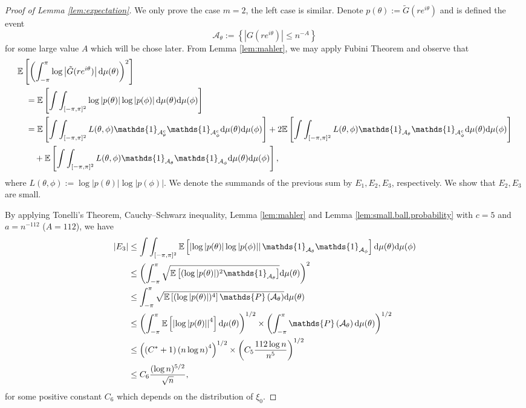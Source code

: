 \documentclass[12pt]{amsart}
\theoremstyle{plain}
\numberwithin{equation}{section}
\renewcommand{\Pr}{\mathbb{P}}
\newcommand{\<}{\langle}
\renewcommand{\>}{\rangle}
\newcommand{\PP}[1]{\left(#1\right)}
\newcommand{\LL}[1]{\left\{#1\right\}}
\newcommand{\dd}{\textnormal{d}}
\newcommand{\E}[2][ ]{\mathbb{E}{#1}\left[#2\right]}
\newcommand{\abs}[1]{\left|#1\right|}
\renewcommand{\Pr}[1]{\mathds{P}\left(#1\right)}
\begin{document}
\begin{proof}[Proof of Lemma \ref{lem:expectation}]
We only prove the case $m=2$, the left case is similar.  Denote $p(\theta) := \tilde{G}(re^{i\theta})$ and is defined the event \[ \mathcal{A}_\theta := \LL{ \abs{G(re^{i\theta})} \leq n^{-A} } \] for some large value $A$ which will be chose later. From Lemma \ref{lem:mahler}, we may apply Fubini Theorem and observe that
\begin{align*}
& \E{\PP{ \int_{-\pi}^{\pi} \log\abs{\tilde{G}(re^{i\theta})} \dd\mu(\theta) }^2} \\
& \quad = \E{\int\int_{[-\pi,\pi]^2} \log\abs{p(\theta)} \log\abs{p(\phi)} \dd\mu(\theta)\dd\mu(\phi) } \\
& \quad = \E{ \int\int_{[-\pi,\pi]^2}  L(\theta,\phi) \mathds{1}_{\mathcal{A}^c_\theta} \mathds{1}_{\mathcal{A}^c_{\phi}} \dd\mu(\theta) \dd\mu(\phi)} + 2\E{\int\int_{[-\pi,\pi]^2}  L(\theta,\phi) \mathds{1}_{\mathcal{A}_\theta} \mathds{1}_{\mathcal{A}^c_{\phi}} \dd\mu(\theta) \dd\mu(\phi)} \\
& \quad\quad + \E{\int\int_{[-\pi,\pi]^2}  L(\theta,\phi) \mathds{1}_{\mathcal{A}_\theta} \mathds{1}_{\mathcal{A}_{\phi}} \dd\mu(\theta)\dd\mu(\phi)},
\end{align*}
where $L(\theta,\phi):= \log\abs{p(\theta)} \log\abs{p(\phi)} $. We denote the summands of the previous sum by $E_1,E_2,E_3$, respectively. We show that $E_2, E_3$ are small.

By applying Tonelli's Theorem, Cauchy--Schwarz inequality, Lemma \ref{lem:mahler} and Lemma \ref{lem:small.ball.probability} with $c=5$ and $a=n^{-112}$ ($A=112$), we have 
\begin{align*}
\abs{E_3} & \leq \int\int_{[-\pi,\pi]^2}\E{ \abs{\log\abs{p(\theta)} \log\abs{p(\phi)}} \mathds{1}_{\mathcal{A}_\theta} \mathds{1}_{\mathcal{A}_{\phi}} } \dd\mu(\theta) \dd\mu(\phi) \\
& \leq \PP{\int_{-\pi}^{\pi} \sqrt{ \E{(\log\abs{p(\theta)})^2 \mathds{1}_{\mathcal{A}_\theta}} } \dd\mu(\theta)}^2 \\
& \leq \int_{-\pi}^{\pi} \sqrt{\E{(\log\abs{p(\theta)})^4} \Pr{\mathcal{A}_\theta}} \dd \mu(\theta) \\
& \leq \PP{ \int_{-\pi}^{\pi} \E{\abs{\log\abs{p(\theta)}}^4 } \dd\mu(\theta)}^{1/2} \times \PP{ \int_{-\pi}^{\pi} \Pr{\mathcal{A}_\theta} \dd\mu(\theta)}^{1/2} \\
& \leq \PP{(C^{*}+1) \PP{n\log n}^4}^{1/2} \times \PP{C_5 \frac{112\log n}{n^5}}^{1/2} \\
& \leq C_6 \frac{(\log n)^{5/2}}{\sqrt{n}}, 
\end{align*}
for some positive constant $C_6$ which depends on the distribution of $\xi_0$.


\end{proof}
\end{document}
